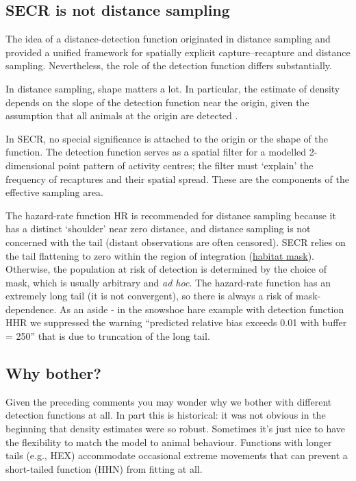 \documentclass[
]{book}
\begin{document}
\subsection{SECR is not distance sampling}\label{secr-is-not-distance-sampling}

The idea of a distance-detection function originated in distance sampling \citep{bablbt01} and \citet{Borchers2015} provided a unified framework for spatially explicit capture--recapture and distance sampling. Nevertheless, the role of the detection function differs substantially.

In distance sampling, shape matters a lot. In particular, the estimate of density depends on the slope of the detection function near the origin, given the assumption that all animals at the origin are detected \citep[e.g.,][]{Buckland2015}.

In SECR, no special significance is attached to the origin or the shape of the function. The detection function serves as a spatial filter for a modelled 2-dimensional point pattern of activity centres; the filter must `explain' the frequency of recaptures and their spatial spread. These are the components of the effective sampling area.

The hazard-rate function HR is recommended for distance sampling because it has a distinct `shoulder' near zero distance, and distance sampling is not concerned with the tail (distant observations are often censored). SECR relies on the tail flattening to zero within the region of integration (\hyperref[Habitat]{habitat mask}). Otherwise, the population at risk of detection is determined by the choice of mask, which is usually arbitrary and \emph{ad hoc}. The hazard-rate function has an extremely long tail (it is not convergent), so there is always a risk of mask-dependence. As an aside - in the snowshoe hare example with detection function HHR we suppressed the warning ``predicted relative bias exceeds 0.01 with buffer = 250'' that is due to truncation of the long tail.

\subsection{Why bother?}\label{whybother1}

Given the preceding comments you may wonder why we bother with different detection functions at all. In part this is historical: it was not obvious in the beginning that density estimates were so robust. Sometimes it's just nice to have the flexibility to match the model to animal behaviour. Functions with longer tails (e.g., HEX) accommodate occasional extreme movements that can prevent a short-tailed function (HHN) from fitting at all.
\end{document}
